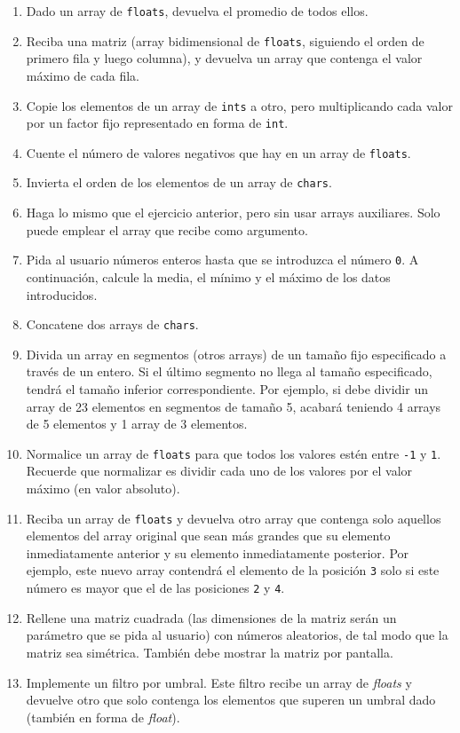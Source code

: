 \documentclass[a4paper]{article}
\newcommand{\code}[1]{\texttt{#1}}
\begin{document}
\begin{enumerate}
    \item Dado un array de \code{floats}, devuelva el promedio de todos ellos.
    \item Reciba una matriz (array bidimensional de \code{floats}, siguiendo el orden de primero fila y luego columna), y devuelva un array que contenga el valor máximo de cada fila.
    \item Copie los elementos de un array de \code{ints} a otro, pero multiplicando cada valor por un factor fijo representado en forma de \code{int}.
    \item Cuente el número de valores negativos que hay en un array de \code{floats}.
    \item Invierta el orden de los elementos de un array de \code{chars}.
    \item Haga lo mismo que el ejercicio anterior, pero sin usar arrays auxiliares. Solo puede emplear el array que recibe como argumento.
    \item Pida al usuario números enteros hasta que se introduzca el número \code{0}. A continuación, calcule la media, el mínimo y el máximo de los datos introducidos.
    \item Concatene dos arrays de \code{chars}.
    \item Divida un array en segmentos (otros arrays) de un tamaño fijo especificado a través de un entero. Si el último segmento no llega al tamaño especificado, tendrá el tamaño inferior correspondiente. Por ejemplo, si debe dividir un array de 23 elementos en segmentos de tamaño 5, acabará teniendo 4 arrays de 5 elementos y 1 array de 3 elementos.
    \item Normalice un array de \code{floats} para que todos los valores estén entre \code{-1} y \code{1}. Recuerde que normalizar es dividir cada uno de los valores por el valor máximo (en valor absoluto).
    \item Reciba un array de \code{floats} y devuelva otro array que contenga solo aquellos elementos del array original que sean más grandes que su elemento inmediatamente anterior y su elemento inmediatamente posterior. Por ejemplo, este nuevo array contendrá el elemento de la posición \code{3} solo si este número es mayor que el de las posiciones \code{2} y \code{4}.
    \item Rellene una matriz cuadrada (las dimensiones de la matriz serán un parámetro que se pida al usuario) con números aleatorios, de tal modo que la matriz sea simétrica. También debe mostrar la matriz por pantalla.
    \item Implemente un filtro por umbral. Este filtro recibe un array de \textit{floats} y devuelve otro que solo contenga los elementos que superen un umbral dado (también en forma de \textit{float}).

\end{enumerate}
\end{document}
